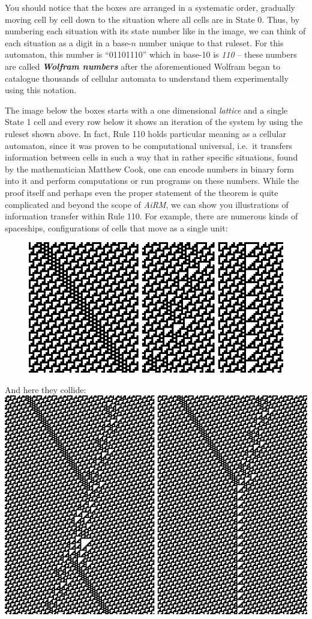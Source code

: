 You should notice that the boxes are arranged in a systematic order,
gradually moving cell by cell down to the situation where all cells are
in State 0. Thus, by numbering each situation with its state number like
in the image, we can think of each situation as a digit in a base-\(n\)
number unique to that ruleset. For this automaton, this number is
``01101110'' which in base-10 is \emph{110} -- these numbers are called
\textbf{\emph{Wolfram numbers}} after the aforementioned Wolfram began
to catalogue thousands of cellular automata to understand them
experimentally using this notation.

The image below the boxes starts with a one dimensional \emph{lattice}
and a single State 1 cell and every row below it shows an iteration of
the system by using the ruleset shown above. In fact, Rule 110 holds
particular meaning as a cellular automaton, since it was proven to be
computational universal, i.e.~it transfers information between cells in
such a way that in rather specific situations, found by the
mathematician Matthew Cook, one can encode numbers in binary form into
it and perform computations or run programs on these numbers. While the
proof itself and perhaps even the proper statement of the theorem is
quite complicated and beyond the scope of \emph{AiRM}, we can show you
illustrations of information transfer within Rule 110. For example,
there are numerous kinds of spaceships, configurations of cells that
move as a single unit:

\begin{figure}[htbp]
\centering
\includegraphics{image_1.png}
\caption{}
\end{figure}

And here they collide: \includegraphics{image_2.png}

